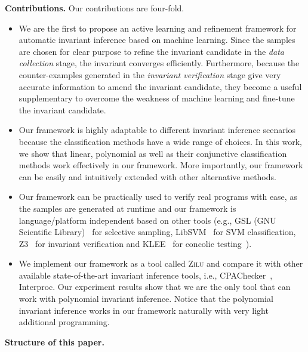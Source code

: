 \medskip\noindent
\textbf{Contributions.}
Our contributions are four-fold. 
\begin{itemize}
    \item 
    We are the first to propose an active learning and refinement framework 
    for automatic invariant inference based on machine learning. 
    Since the samples are chosen for clear purpose 
    to refine the invariant candidate in the \emph{data collection} stage, 
    the invariant converges efficiently. 
    Furthermore, because the counter-examples generated in the \emph{invariant verification} stage 
    give very accurate information to amend the invariant candidate, 
    they become a useful supplementary to overcome the weakness of machine learning 
    and fine-tune the invariant candidate. 
    \item 
    Our framework is highly adaptable to different invariant inference scenarios 
    because the classification methods have a wide range of choices. 
    In this work, we show that linear, polynomial as well as 
    their conjunctive classification methods work effectively in our framework. 
    More importantly, our framework can be easily and intuitively extended with other alternative methods. 
    \item 
    Our framework can be practically used to verify real programs with ease, 
    as the samples are generated at runtime 
    and our framework is language/platform independent based on other tools 
    (e.g., GSL (GNU Scientific Library)~\cite{gough2009gnu} for selective sampling, 
    LibSVM~\cite{chang2011libsvm} for SVM classification, 
    Z3~\cite{de2008z3} for invariant verification 
    and KLEE~\cite{cadar2008klee} for concolic testing~\cite{sen2007concolic}). 
    \item 
    We implement our framework as a tool called \textsc{Zilu} 
    and compare it with other available state-of-the-art invariant inference tools, 
    i.e., CPAChecker~\cite{beyer2011cpachecker}, Interproc. 
    Our experiment results show that 
    we are the only tool that can work with polynomial invariant inference. 
    Notice that the polynomial invariant inference works in our framework 
    naturally with very light additional programming. 
\end{itemize}

\medskip\noindent
\textbf{Structure of this paper.}


